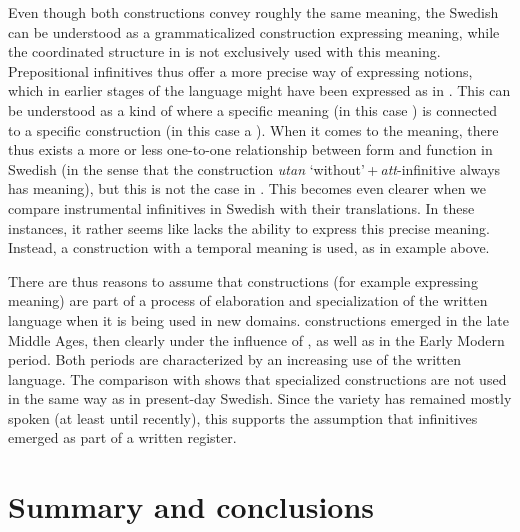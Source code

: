 \documentclass[output=paper]{langscibook}
\begin{document}
Even though both constructions convey roughly the same meaning, the Swedish  can be understood as a grammaticalized construction expressing  meaning, while the coordinated structure in  is not exclusively used with this meaning. Prepositional infinitives thus offer a more precise way of expressing  notions, which in earlier stages of the language might have been expressed as in . This can be understood as a kind of  where a specific meaning (in this case ) is connected to a specific construction (in this case a ). When it comes to the  meaning, there thus exists a more or less one-to-one relationship between form and function in Swedish (in the sense that the construction \textit{utan} ‘without’\,+\,\textit{att}-infinitive always has  meaning), but this is not the case in . This becomes even clearer when we compare instrumental infinitives in Swedish with their  translations. In these instances, it rather seems like  lacks the ability to express this precise meaning. Instead, a construction with a temporal meaning is used, as in example  above. 



There are thus reasons to assume that  constructions (for example expressing  meaning) are part of a process of elaboration and specialization of the written language when it is being used in new domains.  constructions emerged in the late Middle Ages, then clearly under the influence of , as well as in the Early Modern period. Both periods are characterized by an increasing use of the written language. The comparison with  shows that specialized  constructions are not used in the same way as in present-day Swedish. Since the variety has remained mostly spoken (at least until recently), this supports the assumption that  infinitives emerged as part of a written register.  


\section{Summary and conclusions}\label{sec:kalm:6}
\end{document}
